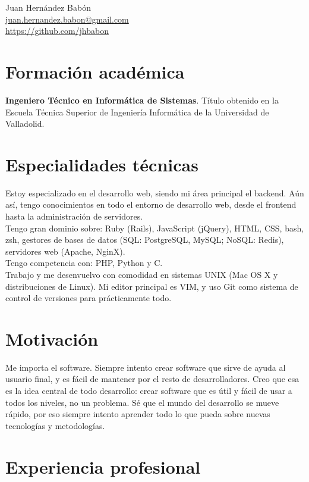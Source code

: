 \documentclass[10pt, a4paper]{article}
\begin{document}
\reversemarginpar
{\LARGE Juan Hernández Babón}\\[0.25cm]
\href{mailto:juan.hernandez.babon@gmail.com}{juan.hernandez.babon@gmail.com}\\
\href{https://github.com/jhbabon}{https://github.com/jhbabon}\\

\section*{Formación académica}

\textbf{Ingeniero Técnico en Informática de Sistemas}. Título obtenido en la Escuela Técnica Superior de Ingeniería Informática de la Universidad de Valladolid.

\section*{Especialidades técnicas}

Estoy especializado en el desarrollo web, siendo mi área principal el backend. Aún así, tengo conocimientos en todo el entorno de desarrollo web, desde el frontend hasta la administración de servidores.\\
Tengo gran dominio sobre: Ruby (Rails), JavaScript (jQuery), HTML, CSS, bash, zsh, gestores de bases de datos (SQL: PostgreSQL, MySQL; NoSQL: Redis), servidores web (Apache, NginX).\\
Tengo competencia con: PHP, Python y C.\\
Trabajo y me desenvuelvo con comodidad en sistemas UNIX (Mac OS X y distribuciones de Linux). Mi editor principal es VIM, y uso Git como sistema de control de versiones para prácticamente todo.

\section*{Motivación}

Me importa el software. Siempre intento crear software que sirve de ayuda al usuario final, y es fácil de mantener por el resto de desarrolladores. Creo que esa es la idea central de todo desarrollo: crear software que es útil y fácil de usar a todos los niveles, no un problema. Sé que el mundo del desarrollo se mueve rápido, por eso siempre intento aprender todo lo que pueda sobre nuevas tecnologías y metodologías.

\section*{Experiencia profesional}
\end{document}
